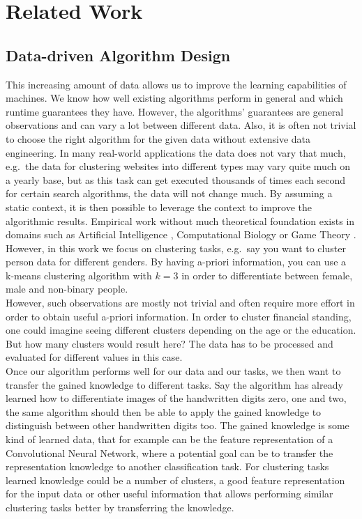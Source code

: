\chapter{Related Work}
\label{chapter:relatedwork}

\section{Data-driven Algorithm Design}

This increasing amount of data allows us to improve the learning capabilities of machines. We know how well existing algorithms perform in general and which runtime guarantees they have. However, the algorithms' guarantees are general observations and can vary a lot between different data. Also, it is often not trivial to choose the right algorithm for the given data without extensive data engineering. In many real-world applications the data does not vary that much, e.g.\ the data for clustering websites into different types may vary quite much on a yearly base, but as this task can get executed thousands of times each second for certain search algorithms, the data will not change much. By assuming a static context, it is then possible to leverage the context to improve the algorithmic results. Empirical work without much theoretical foundation exists in domains such as Artificial Intelligence \cite{Xu:2008:SPA:1622673.1622687}, Computational Biology \cite{deblasio2018adaptive} or Game Theory \cite{likhodedov2004methods}. However, in this work we focus on clustering tasks, e.g.\ say you want to cluster person data for different genders. By having a-priori information, you can use a k-means clustering algorithm with $k = 3$ in order to differentiate between female, male and non-binary people.\\

However, such observations are mostly not trivial and often require more effort in order to obtain useful a-priori information. In order to cluster financial standing, one could imagine seeing different clusters depending on the age or the education. But how many clusters would result here? The data has to be processed and evaluated for different values in this case.\\

Once our algorithm performs well for our data and our tasks, we then want to transfer the gained knowledge to different tasks. Say the algorithm has already learned how to differentiate images of the handwritten digits zero, one and two, the same algorithm should then be able to apply the gained knowledge to distinguish between other handwritten digits too. The gained knowledge is some kind of learned data, that for example can be the feature representation of a Convolutional Neural Network, where a potential goal can be to transfer the representation knowledge to another classification task. For clustering tasks learned knowledge could be a number of clusters, a good feature representation for the input data or other useful information that allows performing similar clustering tasks better by transferring the knowledge.\\

